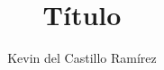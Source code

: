 \documentclass[a4paper]{article}
\title{\textbf{Título}}
\author{Kevin del Castillo Ramírez}
\date{}
\begin{document}
\maketitle

\inputminted{cpp}{../src/include/determinante.hpp}
\end{document}
